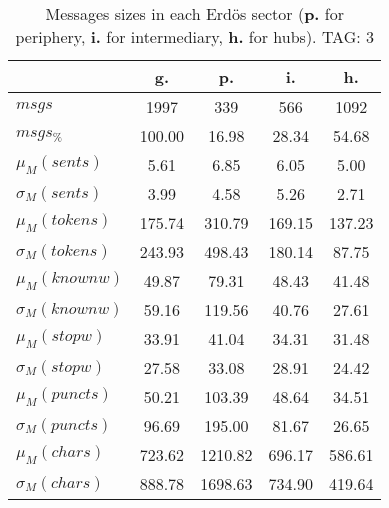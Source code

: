 \begin{table}[h!]
\begin{center}
\begin{tabular}{| l || c | c | c | c |}\hline
 & {\bf g.} & {\bf p.} & {\bf i.} & {\bf h.} \\\hline\hline
$msgs$ & 1997  & 339  & 566  & 1092 \\
$msgs_{\%}$ & 100.00  & 16.98  & 28.34  & 54.68 \\\hline
$\mu_M(sents)$ & 5.61  & 6.85  & 6.05  & 5.00 \\
$\sigma_M(sents)$ & 3.99  & 4.58  & 5.26  & 2.71 \\\hline
$\mu_M(tokens)$ & 175.74  & 310.79  & 169.15  & 137.23 \\
$\sigma_M(tokens)$ & 243.93  & 498.43  & 180.14  & 87.75 \\\hline
$\mu_M(knownw)$ & 49.87  & 79.31  & 48.43  & 41.48 \\
$\sigma_M(knownw)$ & 59.16  & 119.56  & 40.76  & 27.61 \\\hline
$\mu_M(stopw)$ & 33.91  & 41.04  & 34.31  & 31.48 \\
$\sigma_M(stopw)$ & 27.58  & 33.08  & 28.91  & 24.42 \\\hline
$\mu_M(puncts)$ & 50.21  & 103.39  & 48.64  & 34.51 \\
$\sigma_M(puncts)$ & 96.69  & 195.00  & 81.67  & 26.65 \\\hline
$\mu_M(chars)$ & 723.62  & 1210.82  & 696.17  & 586.61 \\
$\sigma_M(chars)$ & 888.78  & 1698.63  & 734.90  & 419.64 \\\hline
\end{tabular}
\caption{Messages sizes in each Erd\"os sector ({{\bf p.}} for periphery, {{\bf i.}} for intermediary, {{\bf h.}} for hubs). TAG: 3}
\end{center}
\end{table}